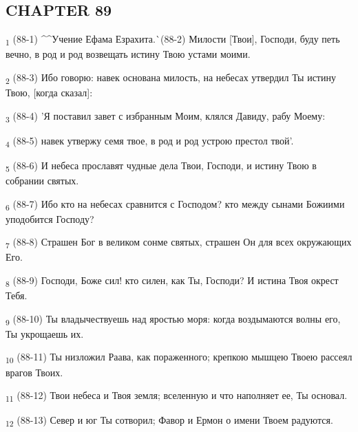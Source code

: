 \subsection{CHAPTER 89}
\begin{tcolorbox}
\textsubscript{1} (88-1) ^^Учение Ефама Езрахита.^^ (88-2) Милости [Твои], Господи, буду петь вечно, в род и род возвещать истину Твою устами моими.
\end{tcolorbox}
\begin{tcolorbox}
\textsubscript{2} (88-3) Ибо говорю: навек основана милость, на небесах утвердил Ты истину Твою, [когда сказал]:
\end{tcolorbox}
\begin{tcolorbox}
\textsubscript{3} (88-4) 'Я поставил завет с избранным Моим, клялся Давиду, рабу Моему:
\end{tcolorbox}
\begin{tcolorbox}
\textsubscript{4} (88-5) навек утвержу семя твое, в род и род устрою престол твой'.
\end{tcolorbox}
\begin{tcolorbox}
\textsubscript{5} (88-6) И небеса прославят чудные дела Твои, Господи, и истину Твою в собрании святых.
\end{tcolorbox}
\begin{tcolorbox}
\textsubscript{6} (88-7) Ибо кто на небесах сравнится с Господом? кто между сынами Божиими уподобится Господу?
\end{tcolorbox}
\begin{tcolorbox}
\textsubscript{7} (88-8) Страшен Бог в великом сонме святых, страшен Он для всех окружающих Его.
\end{tcolorbox}
\begin{tcolorbox}
\textsubscript{8} (88-9) Господи, Боже сил! кто силен, как Ты, Господи? И истина Твоя окрест Тебя.
\end{tcolorbox}
\begin{tcolorbox}
\textsubscript{9} (88-10) Ты владычествуешь над яростью моря: когда воздымаются волны его, Ты укрощаешь их.
\end{tcolorbox}
\begin{tcolorbox}
\textsubscript{10} (88-11) Ты низложил Раава, как пораженного; крепкою мышцею Твоею рассеял врагов Твоих.
\end{tcolorbox}
\begin{tcolorbox}
\textsubscript{11} (88-12) Твои небеса и Твоя земля; вселенную и что наполняет ее, Ты основал.
\end{tcolorbox}
\begin{tcolorbox}
\textsubscript{12} (88-13) Север и юг Ты сотворил; Фавор и Ермон о имени Твоем радуются.
\end{tcolorbox}
